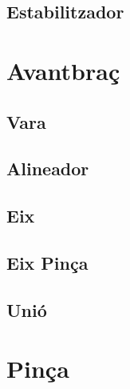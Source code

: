 \documentclass[a4paper, 10pt]{article}
\begin{document}
\subsection{Estabilitzador}

\newpage
\section{Avantbraç}

\subsection{Vara}

\subsection{Alineador}

\subsection{Eix}

\subsection{Eix Pinça}

\subsection{Unió}

\newpage
\section{Pinça}
\end{document}
